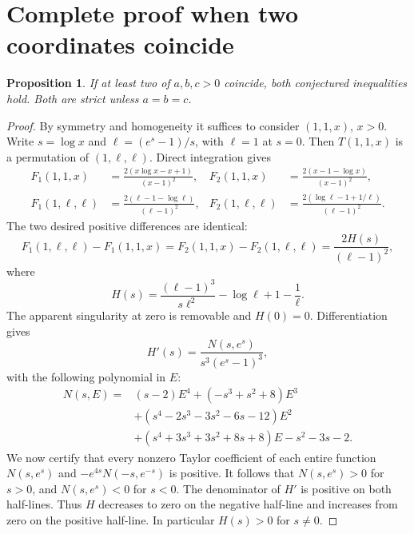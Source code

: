 \documentclass[11pt]{article}
\newtheorem{proposition}{Proposition}
\begin{document}
\section{Complete proof when two coordinates coincide}
\begin{proposition}\label{repeated}
If at least two of $a,b,c>0$ coincide, both conjectured inequalities hold.
Both are strict unless $a=b=c$.
\end{proposition}
\begin{proof}
By symmetry and homogeneity it suffices to consider $(1,1,x)$, $x>0$.
Write $s=\log x$ and $\ell=(e^s-1)/s$, with $\ell=1$ at $s=0$.
Then $T(1,1,x)$ is a permutation of $(1,\ell,\ell)$. Direct integration gives
\begin{align*}
 F_1(1,1,x)&=\frac{2(x\log x-x+1)}{(x-1)^2},&
 F_2(1,1,x)&=\frac{2(x-1-\log x)}{(x-1)^2},\\
 F_1(1,\ell,\ell)&=\frac{2(\ell-1-\log\ell)}{(\ell-1)^2},&
 F_2(1,\ell,\ell)&=\frac{2(\log\ell-1+1/\ell)}{(\ell-1)^2}.
\end{align*}
The two desired positive differences are identical:
\[
 F_1(1,\ell,\ell)-F_1(1,1,x)
 =F_2(1,1,x)-F_2(1,\ell,\ell)
 =\frac{2H(s)}{(\ell-1)^2},
\]
where
\[
 H(s)=\frac{(\ell-1)^3}{s\ell^2}-\log\ell+1-\frac1\ell.
\]
The apparent singularity at zero is removable and $H(0)=0$.
Differentiation gives
\[
 H'(s)=\frac{N(s,e^s)}{s^3(e^s-1)^3},
\]
with the following polynomial in $E$:
\begin{align*}
 N(s,E)={}&(s-2)E^4+(-s^3+s^2+8)E^3\\
 &+(s^4-2s^3-3s^2-6s-12)E^2\\
 &+(s^4+3s^3+3s^2+8s+8)E-s^2-3s-2.
\end{align*}
We now certify that every nonzero Taylor coefficient of each entire function
$N(s,e^s)$ and $-e^{4s}N(-s,e^{-s})$ is positive. It follows that
$N(s,e^s)>0$ for $s>0$, and $N(s,e^s)<0$ for $s<0$.
The denominator of $H'$ is positive on both half-lines. Thus $H$ decreases
to zero on the negative half-line and increases from zero on the positive
half-line. In particular $H(s)>0$ for $s\ne0$.


\end{proof}
\end{document}

